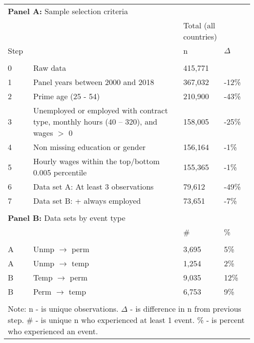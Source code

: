 \begin{tabular}{l>{\raggedright\arraybackslash}p{4in}ll}
   \toprule 
 
\multicolumn{4}{l}{{\bf Panel A:} Sample selection criteria} \\ 

&  & 
\multicolumn{2}{l}{Total (all countries)}
\\  
 
 
\multicolumn{1}{l}{Step} & 
\multicolumn{1}{l}{Description} 
& n & $\Delta$
\\ 
\cmidrule(lr){1-2}
\cmidrule(lr){3-4}
\\[-1.8ex]  
 
0 & Raw data & 415,771 &  \\ 
  1 & Panel years between 2000 and 2018 & 367,032 & -12\% \\ 
  2 & Prime age (25 - 54) & 210,900 & -43\% \\ 
  3 & Unemployed or employed with contract type, monthly hours (40 -- 320), and wages $>$ 0 & 158,005 & -25\% \\ 
  4 & Non missing education or gender & 156,164 & -1\% \\ 
  5 & Hourly wages within the top/bottom 0.005 percentile & 155,365 & -1\% \\ 
  6 & Data set A: At least 3 observations & 79,612 & -49\% \\ 
  7 & Data set B: + always employed & 73,651 & -7\% \\ 
   
\hline \\[-1.8ex]  
 
\multicolumn{4}{l}{{\bf Panel B:} Data sets by event type} \\ 

& & 
\# & \%
\\ 
\cmidrule(lr){1-2}
\cmidrule(lr){3-4}
\\[-1.8ex]  
 
A & Unmp $\rightarrow$ perm & 3,695 & 5\% \\ 
  A & Unmp $\rightarrow$ temp & 1,254 & 2\% \\ 
  B & Temp $\rightarrow$ perm & 9,035 & 12\% \\ 
  B & Perm $\rightarrow$ temp & 6,753 & 9\% \\ 
   \bottomrule \\[-1.8ex] \multicolumn{4}{p{6in}}{Note: n - is unique observations.  $\Delta$ - is difference in n from previous step.  \# - is unique n who experienced at least 1 event.  \% - is percent who experienced an event.} 
\end{tabular}
